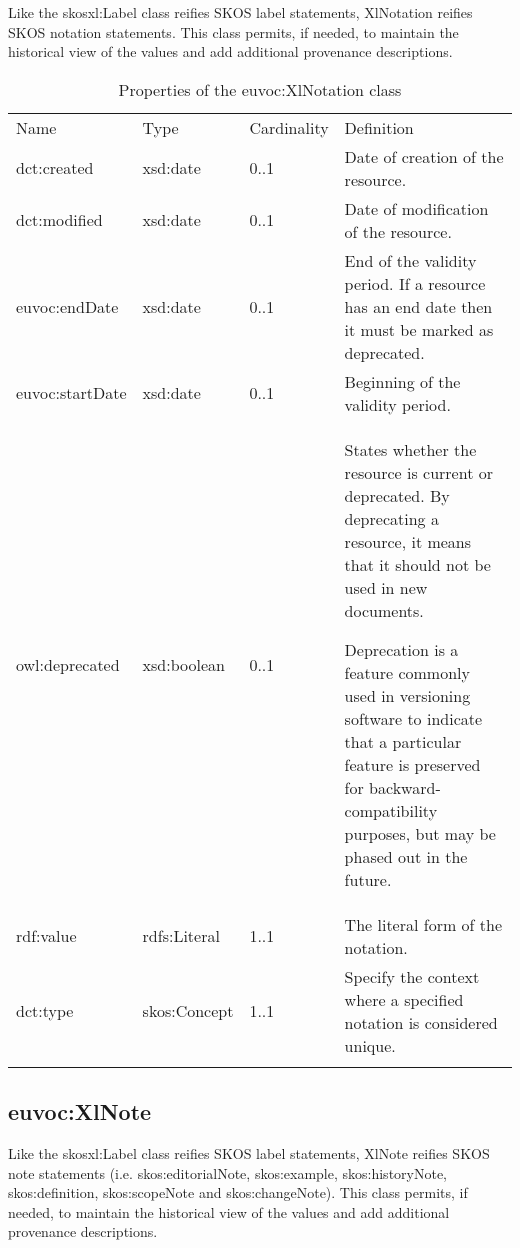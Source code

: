 Like the skosxl:Label class reifies SKOS label statements, XlNotation
reifies SKOS notation statements. This class permits, if needed, to
maintain the historical view of the values and add additional provenance
descriptions.
{
	\footnotesize
	\selectfont%
	\begin{longtable}[c]{@{}p{3cm}p{2cm}p{2cm}p{7.8cm}@{}}
		\toprule\addlinespace
		Name & Type & Cardinality & Definition
		\\\addlinespace
		\midrule\endhead
		dct:created & xsd:date & 0..1 & Date of creation of the resource.
		\\\addlinespace
		dct:modified & xsd:date & 0..1 & Date of modification of the resource.
		\\\addlinespace
		euvoc:endDate & xsd:date & 0..1 & End of the validity period. If a
		resource has an end date then it must be marked as deprecated.
		\\\addlinespace
		euvoc:startDate & xsd:date & 0..1 & Beginning of the validity period.
		\\\addlinespace
		owl:deprecated & xsd:boolean & 0..1 & States whether the resource is
		current or deprecated. By deprecating a resource, it means that it
		should not be used in new documents.
		
		Deprecation is a feature commonly used in versioning software to
		indicate that a particular feature is preserved for
		backward-compatibility purposes, but may be phased out in the future.
		\\\addlinespace
		rdf:value & rdfs:Literal & 1..1 & The literal form of the notation.
		\\\addlinespace
		dct:type & skos:Concept & 1..1 & Specify the context where a specified
		notation is considered unique.
		\\\addlinespace
		\bottomrule
		\addlinespace
		\caption{Properties of the euvoc:XlNotation class}
	\end{longtable}
}

\subsection{euvoc:XlNote}

Like the skosxl:Label class reifies SKOS label statements, XlNote
reifies SKOS note statements (i.e. skos:editorialNote, skos:example,
skos:historyNote, skos:definition, skos:scopeNote and skos:changeNote).
This class permits, if needed, to maintain the historical view of the
values and add additional provenance descriptions.


